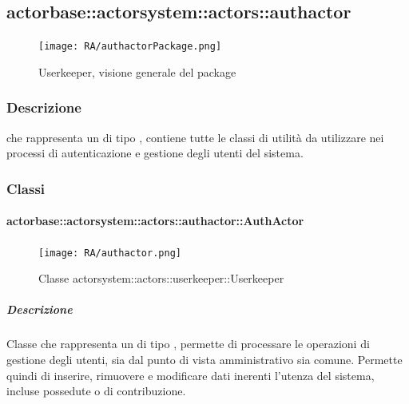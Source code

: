 \documentclass{scalatekids-article}
\begin{document}

\subsection{actorbase::actorsystem::actors::authactor}
\label{sec:actorbase::actorsystem::actors::authactor}

\begin{figure}[H]
  \begin{center}
    \texttt{[image: RA/authactorPackage.png]}
    \caption{Userkeeper, visione generale del package}
  \end{center}
\end{figure}

\subsubsection{Descrizione}
 che rappresenta un  di tipo ,
contiene tutte le classi di utilità da utilizzare nei processi di autenticazione
e gestione degli utenti del sistema.

\subsubsection{Classi}
\paragraph{actorbase::actorsystem::actors::authactor::AuthActor}
\label{sec:actorbase::actorsystem::actors::authactor::AuthActor}

\begin{figure}[H]
  \begin{center}
    \texttt{[image: RA/authactor.png]}
    \caption{Classe actorsystem::actors::userkeeper::Userkeeper}
  \end{center}
\end{figure}

\subparagraph{Descrizione}
Classe che rappresenta un  di tipo , permette di processare
le operazioni di gestione degli utenti, sia dal punto di vista amministrativo sia comune.
Permette quindi di inserire, rimuovere e modificare dati inerenti l'utenza del sistema, incluse
 possedute o di contribuzione.
\end{document}
